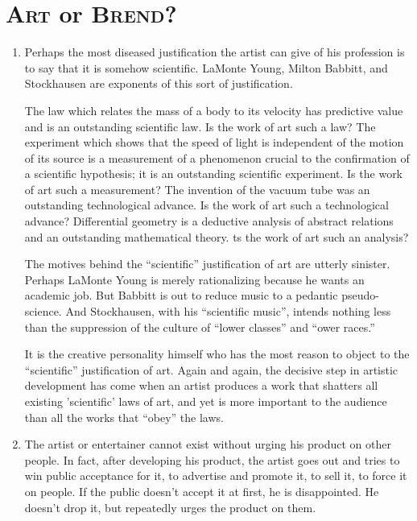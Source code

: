 \chapter{\textsc{Art} or \textsc{Brend}?}

\begin{enumerate}[label=\textbf{\arabic*.}, wide, itemsep=1em]
\item Perhaps the most diseased justification the artist can give of his profession 
is to say that it is somehow scientific. LaMonte Young, Milton Babbitt, and 
Stockhausen are exponents of this sort of justification. 

The law which relates the mass of a body to its velocity has predictive value 
and is an outstanding scientific law. Is the work of art such a law? The 
experiment which shows that the speed of light is independent of the motion 
of its source is a measurement of a phenomenon crucial to the confirmation of 
a scientific hypothesis; it is an outstanding scientific experiment. Is the work 
of art such a measurement? The invention of the vacuum tube was an 
outstanding technological advance. Is the work of art such a technological 
advance? Differential geometry is a deductive analysis of abstract relations 
and an outstanding mathematical theory. ts the work of art such an 
analysis? 

The motives behind the \enquote{scientific} justification of art are utterly sinister. 
Perhaps LaMonte Young is merely rationalizing because he wants an 
academic job. But Babbitt is out to reduce music to a pedantic 
pseudo-science. And Stockhausen, with his \enquote{scientific music}, intends 
nothing less than the suppression of the culture of \enquote{lower classes} and 
\enquote{ower races.} 

It is the creative personality himself who has the most reason to object to 
the \enquote{scientific} justification of art. Again and again, the decisive step in 
artistic development has come when an artist produces a work that shatters 
all existing 'scientific' laws of art, and yet is more important to the 
audience than all the works that \enquote{obey} the laws. 

\item The artist or entertainer cannot exist without urging his product on other 
people. In fact, after developing his product, the artist goes out and tries to 
win public acceptance for it, to advertise and promote it, to sell it, to force it 
on people. If the public doesn't accept it at first, he is disappointed. He 
doesn't drop it, but repeatedly urges the product on them. 


\end{enumerate}
